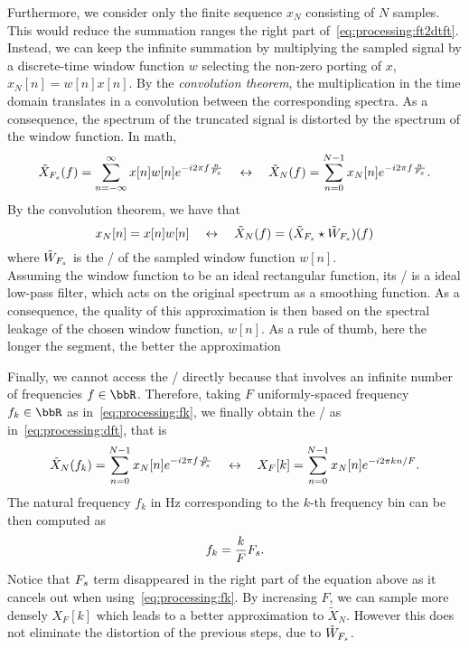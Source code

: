 \mynewline
Furthermore, we consider only the finite sequence $x_N$ consisting of $N$ samples.
This would reduce the summation ranges the right part of~\cref{eq:processing:ft2dtft}.
Instead, we can keep the infinite summation by multiplying the sampled signal by a discrete-time window function ${w}$ selecting the non-zero porting of $x$, $x_N[n] = {w}[n]x[n]$.
By the \textit{convolution theorem}, the multiplication in the time domain translates in a convolution between the corresponding spectra.
As a consequence, the spectrum of the truncated signal is distorted by the spectrum of the window function.
In math,
\begin{equation}\label{eq:processing:dft2dtft}
    \tilde{X}_{F_s}( f) =
    \sum_{n = -\infty}^{\infty}
    x[ n] {w}[ n]
    {e}^{-{i}2\pi f \frac{n}{F_s}}
    \quad \leftrightarrow \quad
    \tilde{X}_N(f) =
    \sum_{n=0}^{N-1}
    x_N[n]
    {e}^{-{i}2\pi f \frac{n}{F_s}}
    .
\end{equation}
By the convolution theorem, we have that
\begin{equation}
    x_N[n] = x[ n] {w}[ n]
    \quad \leftrightarrow \quad
    \tilde{X}_{N}(f) = (\tilde{X}_{F_s} \star \tilde{W}_{F_s})(f)
\end{equation}
where $\tilde{W}_{F_s}$ is the \DTFT/ of the sampled window function ${w}[n]$.
\\Assuming the window function to be an ideal rectangular function, its \DTFT/ is a ideal low-pass filter, which acts on the original spectrum as a smoothing function.
As a consequence, the quality of this approximation is then based on the spectral leakage of the chosen window function, $w[n]$.
As a rule of thumb, here the longer the segment, the better the approximation%

\mynewline
Finally, we cannot access the \DTFT/ directly because that involves an infinite number of frequencies $f \in \R$.
Therefore, taking $F$ uniformly-spaced frequency $f_k\in\R$ as in~\cref{eq:processing:fk}, we finally obtain the \DFT/ as in~\cref{eq:processing:dft}, that is
\begin{equation}
    \tilde{X}_N(f_k) =
    \sum_{n=0}^{N-1}
    x_N[n]
    {e}^{-{i}2\pi f \frac{n}{F_s}}
    \quad \leftrightarrow \quad
    X_F[k] =
    \sum_{n=0}^{N-1}
    x_N[n]
    {e}^{-{i}2\pi k n / F}
    .
\end{equation}
The natural frequency $f_k$ in $\si{\Hz}$ corresponding to the $k$-th frequency bin can be then computed as
\begin{equation}\label{eq:processing:fk}
    f_k = \frac{k}{F}F_s
    .
\end{equation}
Notice that $F_s$ term disappeared in the right part of the equation above as it cancels out when using~\cref{eq:processing:fk}.
By increasing $F$, we can sample more densely $X_F[k]$ which leads to a better approximation to $\tilde{X}_N$.
However this does not eliminate the distortion of the previous steps, due to $\tilde{W}_{F_s}$.

